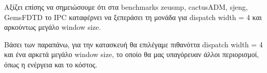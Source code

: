    Αξίζει επίσης να σημειώσουμε ότι στα benchmarks zeusmp, cactusADM, sjeng,
   GemsFDTD το IPC καταφέρνει να ξεπεράσει τη μονάδα για dispatch width = 4 και
   αρκούντως μεγάλο window size.

   Βάσει των παραπάνω, για την κατασκευή θα επιλέγαμε πιθανόττα dispatch width =
   4 και ένα αρκετά μεγάλο window size, το οποίο θα μας υπαγόρευαν άλλοι
   περιορισμοί, όπως η ενέργεια και το κόστος.